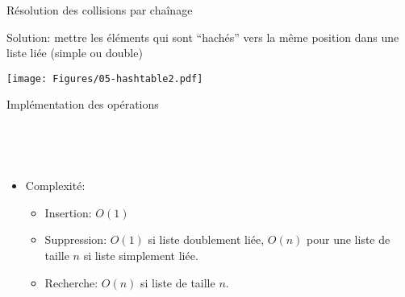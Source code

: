 \begin{frame}{Résolution des collisions par chaînage}

Solution: mettre les éléments qui sont ``hachés'' vers la même
position dans une liste liée (simple ou double)

\bigskip

\centerline{\texttt{[image: Figures/05-hashtable2.pdf]}}

\end{frame}

\begin{frame}{Implémentation des opérations}

~\bigskip

\begin{center}
\begin{small}
~~~~~~~~

\bigskip

\end{small}
\end{center}

\bigskip
\bigskip

\begin{itemize}
\item Complexité:
\begin{itemize}
\item Insertion: $O(1)$
\item Suppression: $O(1)$ si liste doublement liée, $O(n)$ pour une liste de taille $n$ si liste simplement liée.
\item Recherche: $O(n)$ si liste de taille $n$.
\end{itemize}
\end{itemize}

\end{frame}


